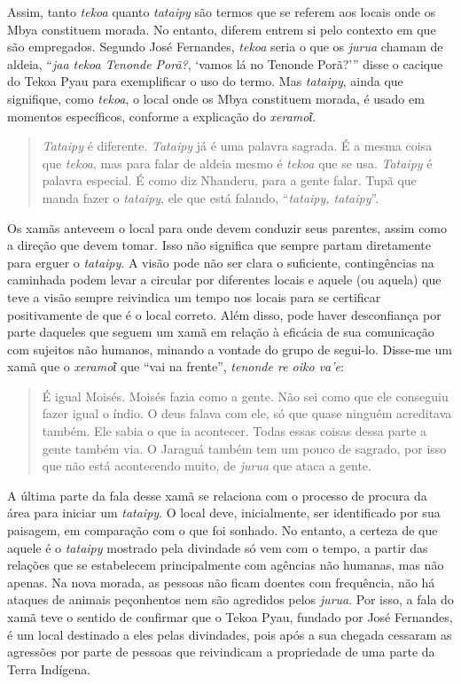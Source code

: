 Assim, tanto \emph{tekoa} quanto \emph{tataipy} são termos que se
referem aos locais onde os Mbya constituem morada. No entanto, diferem
entrem si pelo contexto em que são empregados. Segundo José Fernandes,
\emph{tekoa} seria o que os \emph{jurua} chamam de aldeia, ``\emph{jaa
tekoa Tenonde Porã?}, `vamos lá no Tenonde Porã?''' disse o cacique do
Tekoa Pyau para exemplificar o uso do termo. Mas \emph{tataipy}, ainda
que signifique, como \emph{tekoa}, o local onde os Mbya constituem
morada, é usado em momentos específicos, conforme a explicação do
\emph{xeramoῖ}.

\begin{quote}
\emph{Tataipy} é diferente. \emph{Tataipy} já é uma palavra sagrada. É a
mesma coisa que \emph{tekoa}, mas para falar de aldeia mesmo é
\emph{tekoa} que se usa. \emph{Tataipy} é palavra especial. É como diz
Nhanderu, para a gente falar. Tupã que manda fazer o \emph{tataipy}, ele
que está falando, ``\emph{tataipy, tataipy}''.
\end{quote}

Os xamãs anteveem o local para onde devem conduzir seus parentes, assim
como a direção que devem tomar. Isso não significa que sempre partam
diretamente para erguer o \emph{tataipy}. A visão pode não ser clara o
suficiente, contingências na caminhada podem levar a circular por
diferentes locais e aquele (ou aquela) que teve a visão sempre
reivindica um tempo nos locais para se certificar positivamente de que é
o local correto. Além disso, pode haver desconfiança por parte daqueles
que seguem um xamã em relação à eficácia de sua comunicação com sujeitos
não humanos, minando a vontade do grupo de segui-lo. Disse-me um xamã
que o \emph{xeramoῖ} que ``vai na frente'', \emph{tenonde re oiko va'e}:

\begin{quote}
É igual Moisés. Moisés fazia como a gente. Não sei como que ele
conseguiu fazer igual o índio. O deus falava com ele, só que quase
ninguém acreditava também. Ele sabia o que ia acontecer. Todas essas
coisas dessa parte a gente também via. O Jaraguá também tem um pouco de
sagrado, por isso que não está acontecendo muito, de \emph{jurua} que
ataca a gente.
\end{quote}

A última parte da fala desse xamã se relaciona com o processo de procura
da área para iniciar um \emph{tataipy}. O local deve, inicialmente, ser
identificado por sua paisagem, em comparação com o que foi sonhado. No
entanto, a certeza de que aquele é o \emph{tataipy} mostrado pela
divindade só vem com o tempo, a partir das relações que se estabelecem
principalmente com agências não humanas, mas não apenas. Na nova morada,
as pessoas não ficam doentes com frequência, não há ataques de animais
peçonhentos nem são agredidos pelos \emph{jurua}. Por isso, a fala do
xamã teve o sentido de confirmar que o Tekoa Pyau, fundado por José
Fernandes, é um local destinado a eles pelas divindades, pois após a sua
chegada cessaram as agressões por parte de pessoas que reivindicam a
propriedade de uma parte da Terra Indígena.

